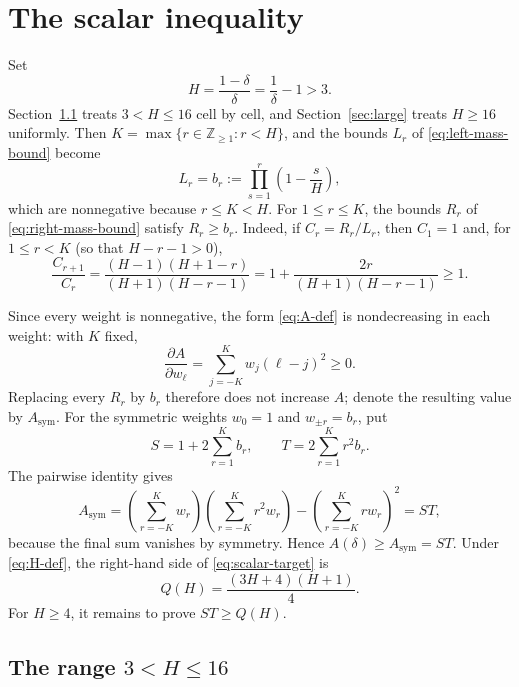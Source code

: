 \documentclass[ECP,preprint]{ejpecp}
\begin{document}
\section{The scalar inequality}
\label{sec:scalar}

Set
\begin{equation}\label{eq:H-def}
  H=\frac{1-\delta}{\delta}=\frac1\delta-1>3.
\end{equation}
Section~\ref{sec:compact} treats $3<H\leq16$ cell by cell, and
Section~\ref{sec:large} treats $H\geq16$ uniformly. Then $K=\max\{r\in\mathbb Z_{\geq1}:r<H\}$, and the bounds $L_r$ of
\eqref{eq:left-mass-bound} become
\begin{equation}\label{eq:b-def}
  L_r=b_r:=\prod_{s=1}^r\left(1-\frac{s}{H}\right),
\end{equation}
which are nonnegative because $r\leq K<H$. For $1\leq r\leq K$, the bounds
$R_r$ of \eqref{eq:right-mass-bound} satisfy $R_r\geq b_r$. Indeed, if
$C_r=R_r/L_r$, then $C_1=1$ and, for $1\leq r<K$ (so that $H-r-1>0$),
\begin{equation}\label{eq:C-ratio}
  \frac{C_{r+1}}{C_r}
  =\frac{(H-1)(H+1-r)}{(H+1)(H-r-1)}
  =1+\frac{2r}{(H+1)(H-r-1)}\geq1.
\end{equation}

Since every weight is nonnegative, the form \eqref{eq:A-def} is
nondecreasing in each weight: with $K$ fixed,
\[
  \frac{\partial A}{\partial w_\ell}
  =\sum_{j=-K}^K w_j(\ell-j)^2\geq0.
\]
Replacing every $R_r$ by $b_r$ therefore does not increase $A$; denote the
resulting value by $A_{\mathrm{sym}}$. For the symmetric weights $w_0=1$ and
$w_{\pm r}=b_r$, put
\begin{equation}\label{eq:S-T}
  S=1+2\sum_{r=1}^K b_r,
  \qquad
  T=2\sum_{r=1}^K r^2b_r.
\end{equation}
The pairwise identity gives
\[
  A_{\mathrm{sym}}
  =\left(\sum_{r=-K}^K w_r\right)
   \left(\sum_{r=-K}^K r^2w_r\right)
   -\left(\sum_{r=-K}^K rw_r\right)^2
  =ST,
\]
because the final sum vanishes by symmetry. Hence
$A(\delta)\geq A_{\mathrm{sym}}=ST$. Under \eqref{eq:H-def}, the right-hand
side of \eqref{eq:scalar-target} is
\begin{equation}\label{eq:Q-def}
  Q(H)=\frac{(3H+4)(H+1)}4.
\end{equation}
For $H\geq4$, it remains to prove $ST\geq Q(H)$.

\subsection{The range \texorpdfstring{$3<H\leq16$}{3 < H <= 16}}
\label{sec:compact}
\end{document}
